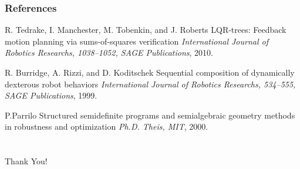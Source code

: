 \documentclass{beamer}
\begin{document}
\begin{frame}
\frametitle{References}
\footnotesize{
\begin{thebibliography}{99} %


 R. Tedrake, I. Manchester, M. Tobenkin, and J. Roberts
\newblock LQR-trees: Feedback motion planning via sums-of-squares verification
\newblock \emph{International Journal of Robotics Researchs, 1038--1052, SAGE Publications}, 2010.

 R. Burridge, A. Rizzi, and D. Koditschek
\newblock Sequential composition of dynamically dexterous robot behaviors
\newblock \emph{International Journal of Robotics Researchs, 534--555, SAGE Publications}, 1999.

 P.Parrilo
\newblock Structured semidefinite programs and semialgebraic geometry methods in robustness and optimization
\newblock \emph{Ph.D. Theis, MIT}, 2000.


\end{thebibliography}
}
\end{frame}

\section{}
\begin{frame}
\begin{center}
\Huge {Thank You!}
\end{center}
\end{frame}

\end{document}
